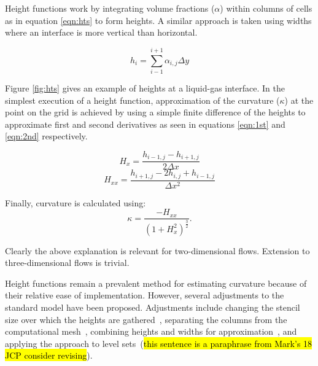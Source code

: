 \noindent Height functions work by integrating volume fractions ($\alpha$) within columns of cells as in equation \ref{eqn:hts} to form heights. A similar approach is taken using widths where an interface is more vertical than horizontal.
 

\begin{equation}
h_{i} = \sum_{i-1}^{i+1} \alpha_{i,j} \Delta y
\label{eqn:hts}
\end{equation}

\noindent Figure \ref{fig:hts} gives an example of heights at a liquid-gas interface. In the simplest execution of a height function, approximation of the curvature ($\kappa$) at the point on the grid is achieved by using a simple finite difference of the heights to approximate first and second derivatives as seen in equations \ref{eqn:1st} and \ref{eqn:2nd} respectively. 

\begin{equation}
H_{x} = \frac{h_{i-1,j}-h_{i+1,j}}{2 \Delta x}
\label{eqn:1st}
\end{equation}
\begin{equation}
H_{xx} = \frac{h_{i+1,j}-2h_{i,j}+h_{i-1,j}}{ \Delta x^2}
\label{eqn:2nd}
\end{equation}

\noindent Finally, curvature is calculated using:
\begin{equation}
\kappa = \frac{-H_{xx}}{(1+H_{x}^{2})^{\frac{3}{2}}}.
\label{eqn:kap}
\end{equation}

\noindent Clearly the above explanation is relevant for two-dimensional flows. Extension to three-dimensional flows is trivial.

Height functions remain a prevalent method for estimating curvature because of their relative ease of implementation. However, several adjustments to the standard model have been proposed. Adjustments include changing the stencil size over which the heights are gathered~\cite{1}, separating the columns from the computational mesh~\cite{2}, combining heights and widths for approximation~\cite{2}, and applying the approach to level sets~\cite{2}(\hl{this sentence is a paraphrase from Mark's 18 JCP consider revising}).

